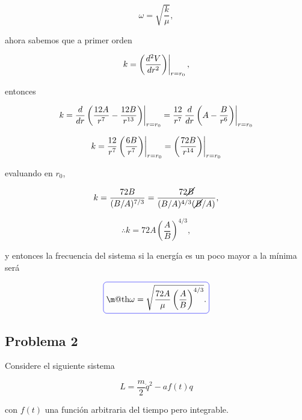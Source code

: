 \documentclass[a4paper,10pt]{article}
\makeatletter
\numberwithin{equation}{section}
\newcommand{\zerodel}{.\kern-\nulldelimiterspace}
\newcommand*{\boxcolor}{blue}
\renewcommand{\boxed}[1]{\textcolor{\boxcolor}{%
\tikz[baseline={([yshift=-1ex]current bounding box.center)}] \node [rectangle, minimum width=1ex,rounded corners,draw] {\normalcolor\m@th$\displaystyle#1$};}}
\makeatother
\begin{document}
\begin{equation}
 \omega = \sqrt{\frac{k}{\mu}},
\end{equation}

ahora sabemos que a primer orden 

\begin{equation}
 k = \left\zerodel\left(\frac{d^2V}{dr^2} \right)\right|_{r=r_0},
\end{equation}

entonces 

\begin{equation}
 k =  \left\zerodel\frac{d}{dr}\left(\frac{12A}{r^7} - \frac{12B}{r^{13}}\right)\right|_{r=r_0}
 = \frac{12}{r^7}\left\zerodel\frac{d}{dr}\left(A - \frac{B}{r^{6}}\right)\right|_{r=r_0}
\end{equation}

\begin{equation}
 k = \frac{12}{r^7}\left\zerodel\left(\frac{6B}{r^{7}}\right)\right|_{r=r_0}  
 = \left\zerodel\left(\frac{72B}{r^{14}}\right)\right|_{r=r_0}
\end{equation}

evaluando en $r_0$, 

\begin{equation}
 k = \frac{72B}{(B/A)^{7/3}} = \frac{72\cancel{B}}{(B/A)^{4/3}(\cancel{B}/A)},
\end{equation}

\begin{equation}
 \therefore k = 72A\left(\frac{A}{B}\right)^{4/3},
\end{equation}

y entonces la frecuencia del sistema si la energía es un poco mayor a la mínima 
será

\begin{equation}
 \boxed{\omega = \sqrt{\frac{72A}{\mu}\left(\frac{A}{B}\right)^{4/3}}.}
\end{equation}

\subsection{Problema 2}

Considere el siguiente sistema 

$$
L = \frac{m}{2}\dot{q}^2 - af(t)q
$$

con $f(t)$ una función arbitraria del tiempo pero integrable.
\end{document}
